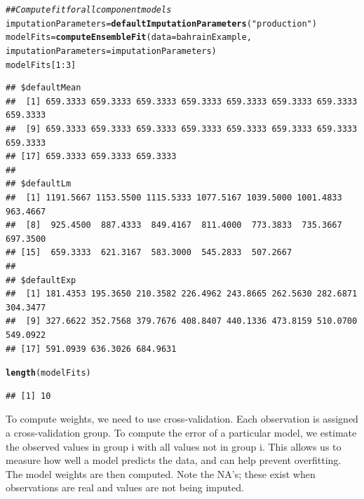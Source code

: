 \documentclass[nojss]{jss}\usepackage[]{graphicx}\usepackage[]{color}
\makeatletter
\newcommand{\hlnum}[1]{\textcolor[rgb]{0.686,0.059,0.569}{#1}}%
\newcommand{\hlstr}[1]{\textcolor[rgb]{0.192,0.494,0.8}{#1}}%
\newcommand{\hlcom}[1]{\textcolor[rgb]{0.678,0.584,0.686}{\textit{#1}}}%
\newcommand{\hlopt}[1]{\textcolor[rgb]{0,0,0}{#1}}%
\newcommand{\hlstd}[1]{\textcolor[rgb]{0.345,0.345,0.345}{#1}}%
\newcommand{\hlkwb}[1]{\textcolor[rgb]{0.69,0.353,0.396}{#1}}%
\newcommand{\hlkwc}[1]{\textcolor[rgb]{0.333,0.667,0.333}{#1}}%
\newcommand{\hlkwd}[1]{\textcolor[rgb]{0.737,0.353,0.396}{\textbf{#1}}}%
\newenvironment{kframe}{%
 \def\at@end@of@kframe{}%
 \ifinner\ifhmode%
  \def\at@end@of@kframe{\end{minipage}}%
  \begin{minipage}{\columnwidth}%
 \fi\fi%
 \def\FrameCommand##1{\hskip\@totalleftmargin \hskip-\fboxsep
 \colorbox{shadecolor}{##1}\hskip-\fboxsep
     \hskip-\linewidth \hskip-\@totalleftmargin \hskip\columnwidth}%
 \MakeFramed {\advance\hsize-\width
   \@totalleftmargin\z@ \linewidth\hsize
   \@setminipage}}%
 {\par\unskip\endMakeFramed%
 \at@end@of@kframe}
\newenvironment{knitrout}{}{} %
\makeatother
\begin{document}
\begin{knitrout}
\color{fgcolor}\begin{kframe}
\begin{alltt}
\hlcom{## Compute fit for all component models}
\hlstd{imputationParameters} \hlkwb{=} \hlkwd{defaultImputationParameters}\hlstd{(}\hlstr{"production"}\hlstd{)}
\hlstd{modelFits} \hlkwb{=} \hlkwd{computeEnsembleFit}\hlstd{(}\hlkwc{data} \hlstd{= bahrainExample,}
                               \hlkwc{imputationParameters} \hlstd{= imputationParameters)}
\hlstd{modelFits[}\hlnum{1}\hlopt{:}\hlnum{3}\hlstd{]}
\end{alltt}
\begin{verbatim}
## $defaultMean
##  [1] 659.3333 659.3333 659.3333 659.3333 659.3333 659.3333 659.3333 659.3333
##  [9] 659.3333 659.3333 659.3333 659.3333 659.3333 659.3333 659.3333 659.3333
## [17] 659.3333 659.3333 659.3333
## 
## $defaultLm
##  [1] 1191.5667 1153.5500 1115.5333 1077.5167 1039.5000 1001.4833  963.4667
##  [8]  925.4500  887.4333  849.4167  811.4000  773.3833  735.3667  697.3500
## [15]  659.3333  621.3167  583.3000  545.2833  507.2667
## 
## $defaultExp
##  [1] 181.4353 195.3650 210.3582 226.4962 243.8665 262.5630 282.6871 304.3477
##  [9] 327.6622 352.7568 379.7676 408.8407 440.1336 473.8159 510.0700 549.0922
## [17] 591.0939 636.3026 684.9631
\end{verbatim}
\begin{alltt}
\hlkwd{length}\hlstd{(modelFits)}
\end{alltt}
\begin{verbatim}
## [1] 10
\end{verbatim}
\end{kframe}
\end{knitrout}

To compute weights, we need to use cross-validation.  Each observation is
assigned a cross-validation group.  To compute the error of a particular model,
we estimate the observed values in group i with all values not in group i.
This allows us to measure how well a model predicts the data, and can help
prevent overfitting.  The model weights are then computed.  Note the NA's;
these exist when observations are real and values are not being imputed.
\end{document}

